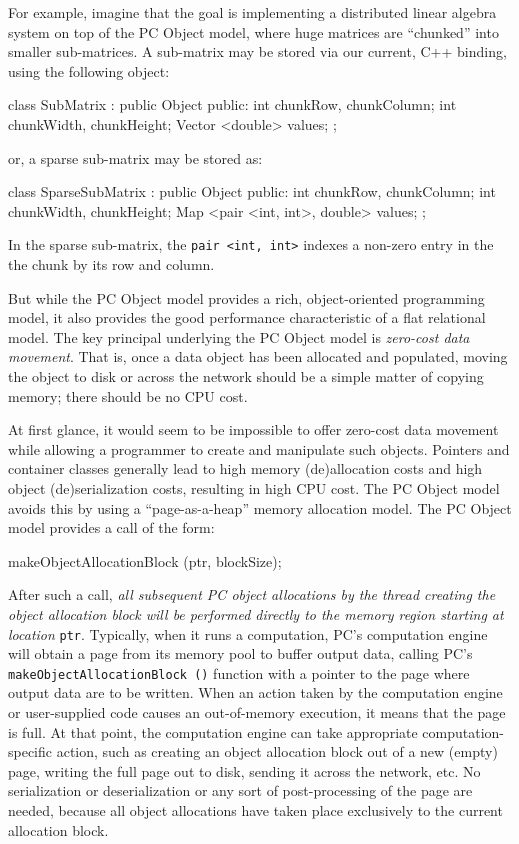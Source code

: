 For example, imagine that the goal is implementing a distributed linear algebra system on top of the PC Object model, where huge matrices are ``chunked'' into
smaller sub-matrices.  A sub-matrix may be stored via our current, C++ binding, using the following object:

\begin{code}
class SubMatrix : public Object {
public:
	int chunkRow, chunkColumn;
	int chunkWidth, chunkHeight;
	Vector <double> values; 
};
\end{code}

or, a sparse sub-matrix may be stored as:

\begin{code}
class SparseSubMatrix : public Object {
public:
	int chunkRow, chunkColumn;
	int chunkWidth, chunkHeight;
	Map <pair <int, int>, double> values; 
};
\end{code}

In the sparse sub-matrix, the \texttt{pair <int, int>} indexes a non-zero entry in the the chunk by its row and column.

But while the PC Object model provides a rich, object-oriented programming model, it also provides the good performance characteristic
of a flat relational model.
The key principal underlying the PC Object model is \emph{zero-cost data movement}.  That is, once a data object
has been allocated and populated, moving the object to disk or across the network should be a simple matter of copying memory; there
should be no CPU cost.

At first glance, it would seem to be impossible to offer zero-cost data movement while allowing a programmer to create and manipulate such objects.  
Pointers and container classes 
generally lead to high memory (de)allocation costs and high object (de)serialization costs, resulting in high CPU cost.
The PC Object model avoids this 
by using a ``page-as-a-heap'' memory allocation model.  
The PC Object model provides a call of the form:

\begin{code}
makeObjectAllocationBlock (ptr, blockSize);
\end{code}

After such a call, \emph{all subsequent PC object allocations by the thread creating the object allocation block will be performed directly to the memory
region starting at location} \texttt{ptr}.
Typically, when it runs a computation, PC's computation engine will obtain a page from its memory pool to buffer output data, calling
PC's
\texttt{makeObjectAllocationBlock ()} function with a pointer to the page where output data are to be written.  
When an action taken by the computation engine or user-supplied code causes an
out-of-memory execution, it means that the page is full.  At that point, the computation engine can take appropriate computation-specific 
action, such as creating 
an object allocation block out of a new (empty) page, writing the full page out to disk, sending it across the network, etc.  
No serialization or deserialization or any sort of post-processing of the page are needed, 
because all object allocations have taken place exclusively to the current allocation block.  

